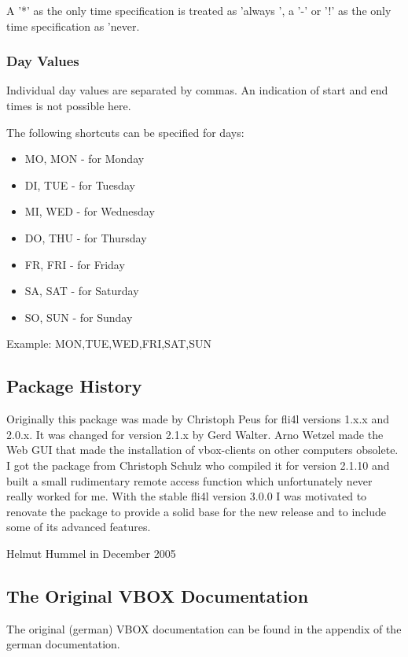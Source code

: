 A '*' as the only time specification is treated as 'always ', a '-' or '!'
as the only time specification as 'never.

\subsubsection{Day Values}
Individual day values are separated by commas.
An indication of start and end times is not possible here.

The following shortcuts can be specified for days:
\begin{itemize}
    \item MO, MON - for Monday
    \item DI, TUE - for Tuesday
    \item MI, WED - for Wednesday
    \item DO, THU - for Thursday
    \item FR, FRI - for Friday
    \item SA, SAT - for Saturday
    \item SO, SUN - for Sunday
\end{itemize}

Example:
MON,TUE,WED,FRI,SAT,SUN

\subsection{Package History}
Originally this package was made by Christoph Peus for fli4l versions 1.x.x and 2.0.x. It was changed
for version 2.1.x by Gerd Walter. Arno Wetzel made the Web GUI that made the installation of vbox-clients
on other computers obsolete. I got the package from Christoph Schulz who compiled it for version 2.1.10
and built a small rudimentary remote access function which unfortunately never really worked for me. With the
stable fli4l version 3.0.0 I was motivated to renovate the package to provide a solid base for the new
release and to include some of its advanced features.

Helmut Hummel in December 2005

\subsection{The Original VBOX Documentation}

The original (german) VBOX documentation can be found in the appendix of the german documentation.
